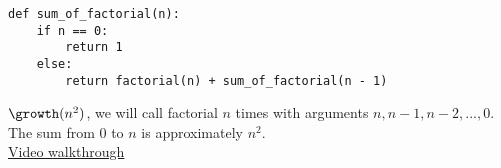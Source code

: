 \begin{blocksection}
\question \begin{lstlisting}
def sum_of_factorial(n):
    if n == 0:
        return 1
    else:
        return factorial(n) + sum_of_factorial(n - 1)
\end{lstlisting}

\begin{solution}[0.0in]
  $\growth(n^2)$, we will call factorial $n$ times with arguments $n, n-1, n-2,
  ..., 0$.  The sum from $0$ to $n$ is approximately $n^2$.\\
\href{https://www.youtube.com/watch?v=XsdTV6cAAjY&vq=hd1080&t=25m25s}{Video walkthrough}
\end{solution}
\end{blocksection}
